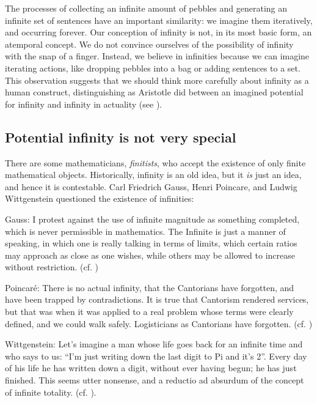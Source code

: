   The processes of collecting an infinite amount of pebbles and generating an infinite set of sentences have an important similarity: we imagine them iteratively, and occurring forever. Our conception of infinity is not, in its most basic form, an atemporal concept. We do not convince ourselves of the possibility of infinity with the snap of a finger. Instead, we believe in infinities because we can imagine iterating actions, like dropping pebbles into a bag or adding sentences to a set. This observation suggests that we should think more carefully about infinity as a human construct, distinguishing as Aristotle did between an imagined potential for infinity and infinity in actuality (see \citealt{Lear1988}).

\subsection{Potential infinity is not very special}

There are some mathematicians, \textit{finitists}, who accept the existence of only finite mathematical objects. Historically, infinity is an old idea, but it \textit{is} just an idea, and hence it is contestable. Carl Friedrich Gauss, Henri Poincare, and Ludwig Wittgenstein questioned the existence of infinities: 

Gauss: I protest against the use of infinite magnitude as something completed, which is never permissible in mathematics. The Infinite is just a manner of speaking, in which one is really talking in terms of limits, which certain ratios may approach as close as one wishes, while others may be allowed to increase without restriction. (cf. \citealt{Waterhouse1979})

Poincaré: There is no actual infinity, that the Cantorians have forgotten, and have been trapped by contradictions. It is true that Cantorism rendered services, but that was when it was applied to a real problem whose terms were clearly defined, and we could walk safely. Logisticians as Cantorians have forgotten. (cf. \citealt{PoincaréMaitland2003}) 

Wittgenstein: Let's imagine a man whose life goes back for an infinite time and who says to us: “I'm just writing down the last digit to Pi and it's 2”. Every day of his life he has written down a digit, without ever having begun; he has just finished. This seems utter nonsense, and a reductio ad absurdum of the concept of infinite totality. (cf. \citealt{Wittgenstein1980}).

